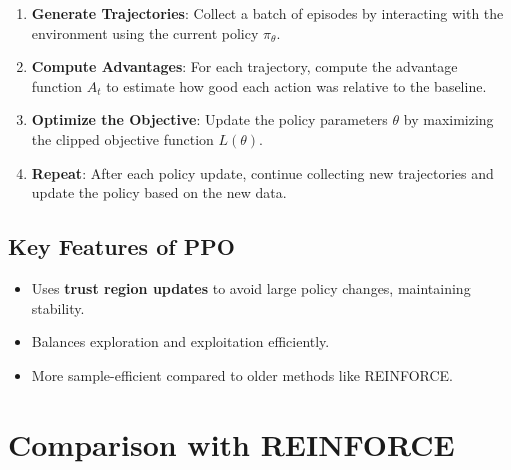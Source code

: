 \documentclass[
]{book}
\providecommand{\tightlist}{%
  \setlength{\itemsep}{0pt}\setlength{\parskip}{0pt}}
\begin{document}
\begin{enumerate}
\def\labelenumi{\arabic{enumi}.}
\tightlist
\item
  \textbf{Generate Trajectories}: Collect a batch of episodes by interacting with the environment using the current policy \(\pi_\theta\).
\item
  \textbf{Compute Advantages}: For each trajectory, compute the advantage function \(A_t\) to estimate how good each action was relative to the baseline.
\item
  \textbf{Optimize the Objective}: Update the policy parameters \(\theta\) by maximizing the clipped objective function \(L(\theta)\).
\item
  \textbf{Repeat}: After each policy update, continue collecting new trajectories and update the policy based on the new data.
\end{enumerate}

\subsection{\texorpdfstring{\textbf{Key Features of PPO}}{Key Features of PPO}}\label{key-features-of-ppo}

\begin{itemize}
\tightlist
\item
  Uses \textbf{trust region updates} to avoid large policy changes, maintaining stability.
\item
  Balances exploration and exploitation efficiently.
\item
  More sample-efficient compared to older methods like REINFORCE.
\end{itemize}

\section{Comparison with REINFORCE}\label{comparison-with-reinforce}
\end{document}
